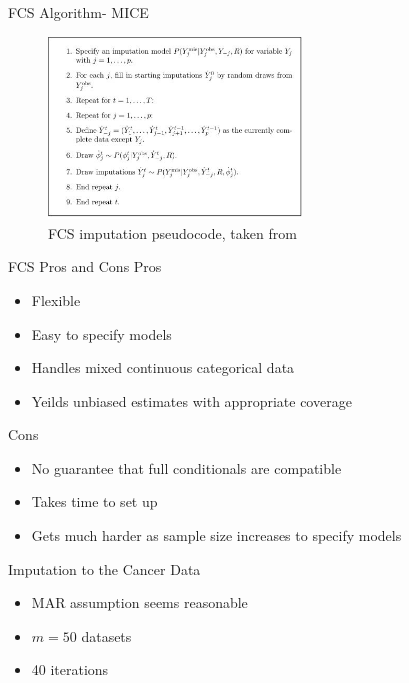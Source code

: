 \begin{frame}{FCS Algorithm- MICE}
  \begin{figure}[h!]
  \centering
    \includegraphics[width=0.6\textwidth]{fcs_algo}
  \caption{FCS imputation pseudocode, taken from \cite{VanBuuren2012}}
\label{fig:fcsexample}
\end{figure}
\end{frame}

\begin{frame}{FCS Pros and Cons}
Pros
 \begin{itemize}
  \item Flexible
  \item Easy to specify models
  \item Handles mixed continuous categorical data
  \item Yeilds unbiased estimates with appropriate coverage
 \end{itemize}

 Cons
 \begin{itemize}
  \item No guarantee that full conditionals are compatible
  \item Takes time to set up
  \item Gets much harder as sample size increases to specify models
 \end{itemize}

\end{frame}

\begin{frame}{Imputation to the Cancer Data}

 \begin{itemize}
  \item MAR assumption seems reasonable
  \item $m=50$ datasets
  \item 40 iterations
 \end{itemize}

\end{frame}

